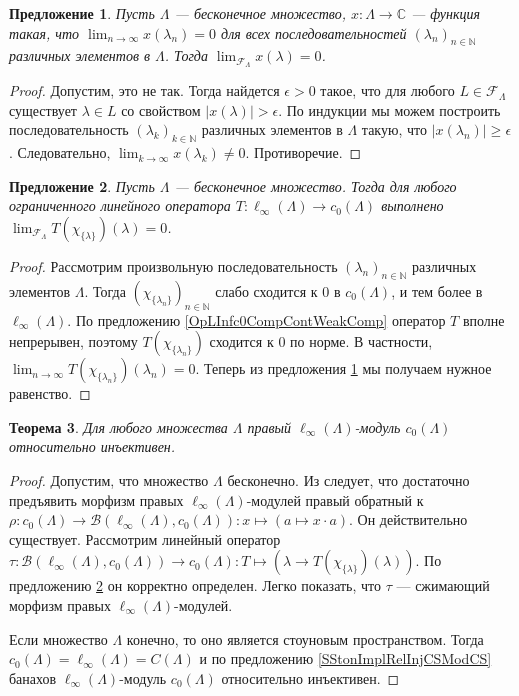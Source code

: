 \documentclass[12pt]{article}
\newtheorem{theorem}{Теорема}[section]
\newtheorem{proposition}[theorem]{Предложение}
\begin{document}
\begin{proposition}\label{FrechFiltConvCharac} Пусть $\Lambda$ --- бесконечное множество, $x:\Lambda\to\mathbb{C}$ --- функция такая, что $\lim_{n\to\infty} x(\lambda_n)=0$ для всех последовательностей $(\lambda_n)_{n\in\mathbb{N}}$ различных элементов в $\Lambda$. Тогда $\lim_{\mathcal{F}_{\Lambda}}x(\lambda)=0$.
\end{proposition}
\begin{proof} Допустим, это не так. Тогда найдется $\epsilon > 0$ такое, что для любого $L\in\mathcal{F}_{\Lambda}$ существует $\lambda\in L$ со свойством $|x(\lambda)|>\epsilon$. По индукции мы можем построить последовательность $(\lambda_k)_{k\in\mathbb{N}}$ различных элементов в $\Lambda$ такую, что $|x(\lambda_n)|\geq \epsilon$. Следовательно, $\lim_{k\to\infty} x(\lambda_k)\neq 0$. Противоречие.
\end{proof}

\begin{proposition}\label{OpLInfc0DiagConv0} Пусть $\Lambda$ --- бесконечное множество. Тогда для любого ограниченного линейного оператора $T:\ell_\infty(\Lambda)\to c_0(\Lambda)$ выполнено $\lim_{\mathcal{F}_{\Lambda}}T(\chi_{\{\lambda\}})(\lambda)=0$.
\end{proposition}
\begin{proof} Рассмотрим произвольную последовательность $(\lambda_n)_{n\in\mathbb{N}}$ различных элементов $\Lambda$. Тогда $(\chi_{\{\lambda_n\}})_{n\in\mathbb{N}}$ слабо сходится к 0 в $c_0(\Lambda)$, и тем более в $\ell_\infty(\Lambda)$. По предложению \ref{OpLInfc0CompContWeakComp} оператор $T$ вполне непрерывен, поэтому $T(\chi_{\{\lambda_n\}})$ сходится к 0 по норме. В частности, $\lim_{n\to\infty} T(\chi_{\{\lambda_n\}})(\lambda_n)=0$. Теперь из предложения \ref{FrechFiltConvCharac} мы получаем нужное равенство.
\end{proof}

\begin{theorem}\label{RelInjLInfModc0} Для любого множества $\Lambda$ правый $\ell_\infty(\Lambda)$-модуль $c_0(\Lambda)$ относительно инъективен.
\end{theorem}
\begin{proof} Допустим, что множество $\Lambda$ бесконечно. Из \cite[предложение IV.1.39]{HelHomolBanTopAlg} следует, что достаточно предъявить морфизм правых $\ell_\infty(\Lambda)$-модулей правый обратный к  $\rho:c_0(\Lambda)\to\mathcal{B}(\ell_\infty(\Lambda), c_0(\Lambda)):x\mapsto(a\mapsto x\cdot a)$. Он действительно существует. Рассмотрим линейный оператор $\tau:\mathcal{B}(\ell_\infty(\Lambda), c_0(\Lambda))\to c_0(\Lambda): T\mapsto(\lambda\to T(\chi_{\{\lambda\}})(\lambda))$. По предложению \ref{OpLInfc0DiagConv0} он корректно определен. Легко показать, что $\tau$ --- сжимающий морфизм правых $\ell_\infty(\Lambda)$-модулей.

    Если множество $\Lambda$ конечно, то оно является стоуновым пространством. Тогда $c_0(\Lambda)=\ell_\infty(\Lambda)=C(\Lambda)$ и по предложению \ref{SStonImplRelInjCSModCS} банахов $\ell_\infty(\Lambda)$-модуль $c_0(\Lambda)$ относительно инъективен.
\end{proof}
\end{document}

